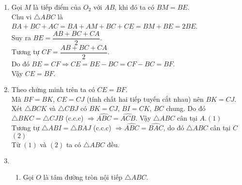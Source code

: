 \begin{bt}
{\begin{center}
		\end{center}
		\begin{enumerate}
			\item 
			Gọi $M$ là tiếp điểm của $O_2$ với $AB$, khi đó ta có $BM=BE$.\\
			Chu vi $\triangle ABC$ là $BA+BC+AC=BA+AM+BC+CE=BM+BE=2BE$.\\
			Suy ra $BE=\dfrac{AB+BC+CA}{2}$.\\
			Tương tự $CF=\dfrac{AB+BC+CA}{2}$.\\
			Do đó $BE=CF\Rightarrow CE=BE-BC=CF-BC=BF$.\\
			Vậy $CE=BF$.
			\item
			Theo chứng minh trên ta có $CE=BF$.\\
			Mà $BF=BK$, $CE=CJ$ (tính chất hai tiếp tuyến cắt nhau) nên $BK=CJ$.\\
			Xét $\triangle BCK$ và $\triangle CBJ$ có $BK=CJ$, $BI=CK$, $BC$ chung. Do đó
			$\triangle BKC =\triangle CJB$ (c.c.c) $\Rightarrow \widehat{ABC} = \widehat{ACB}$. Vậy $\triangle ABC$ cân tại $A$.\hfill $(1)$\\
			Tương tự $\triangle ABI=\triangle BAJ$ (c.c.c) $\Rightarrow \widehat{ABC}=\widehat{BAC}$, do đó $\triangle ABC$ cân tại $C$ \hfill $(2)$\\
			Từ $(1)$ và $(2)$ ta có $\triangle ABC$ đều.
			\item 
			\begin{enumerate}[1)]
				\item Gọi $O$ là tâm đường tròn nội tiếp $\triangle ABC$. 
\end{enumerate}
\end{enumerate}}
\end{bt}
